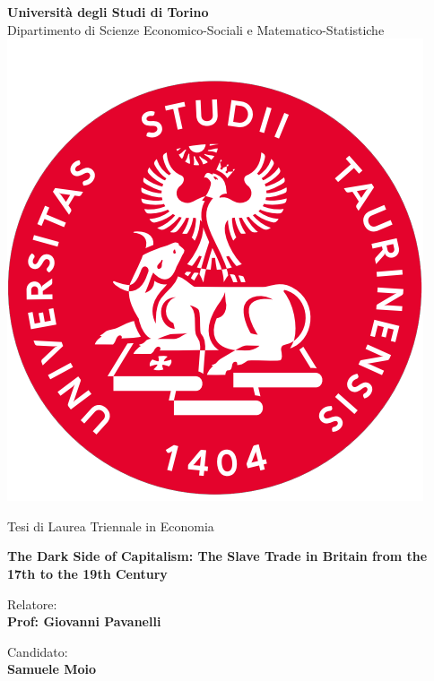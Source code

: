 \begin{titlepage}

\begin{center}
    \textbf{\huge{Università degli Studi di Torino}}
    \vspace{2mm}
    \\ \LARGE{Dipartimento di Scienze Economico-Sociali e Matematico-Statistiche}
    \vspace{5mm}
    \\ \includegraphics[keepaspectratio=true,scale=0.4]{images/unito_logo.png}
    \vspace{5mm}
\end{center}

\begin{center}
    \LARGE{Tesi di Laurea Triennale in Economia} 
\end{center}

\vspace{15mm}
\begin{center}
    \textbf{\huge{The Dark Side of Capitalism: The Slave Trade in Britain from the 17th to the 19th Century}}
\end{center}
\vspace{30mm}

\begin{minipage}[t]{0.47\textwidth}
	{\large{Relatore:}{\normalsize\vspace{3mm}
	\bf\\ \large{Prof: Giovanni Pavanelli} \normalsize\vspace{3mm}\bf}}
\end{minipage}
\hfill
\begin{minipage}[t]{0.47\textwidth}\raggedleft
	{\large{Candidato:}{\normalsize\vspace{3mm} \bf\\ \large{Samuele Moio}}}
\end{minipage}

\vspace{40 mm}
\hrulefill
\\ 

\end{titlepage}